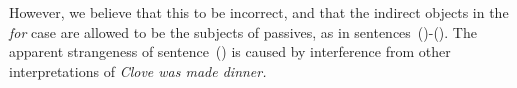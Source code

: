 
However, we believe that this to be incorrect, and that the indirect objects in
the {\it for} case are allowed to be the subjects of passives, as in
sentences~()-().  The apparent strangeness of sentence~() is
caused by interference from other interpretations of {\it Clove was made
dinner.}




